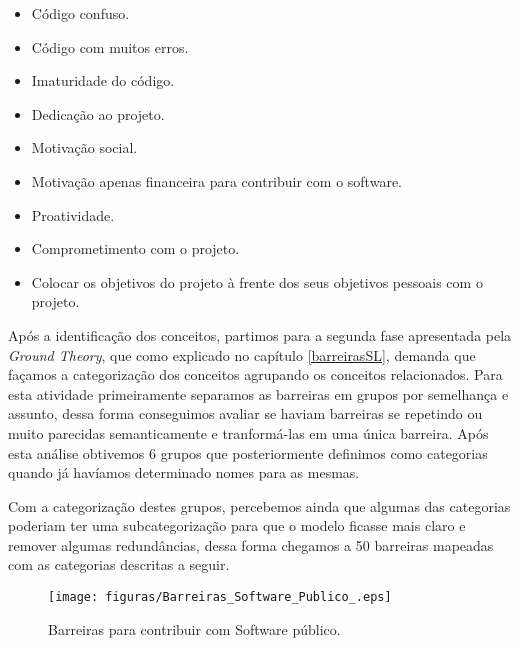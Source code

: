 \begin{itemize}
\item Código confuso.
\item Código com muitos erros.
\item Imaturidade do código.
%
\item Dedicação ao projeto.
\item Motivação social.
\item Motivação apenas financeira para contribuir com o software.
\item Proatividade.
\item Comprometimento com o projeto.
\item Colocar os objetivos do projeto à frente dos seus objetivos pessoais com o projeto.
%

\end{itemize}

Após a identificação dos conceitos, partimos para a segunda fase apresentada pela
\textit{Ground Theory}, que como explicado no capítulo \ref{barreirasSL}, demanda que  
façamos a categorização dos conceitos agrupando os conceitos relacionados. Para esta 
atividade primeiramente separamos as barreiras em grupos por semelhança e assunto,
dessa forma conseguimos avaliar se haviam barreiras se repetindo ou muito parecidas
semanticamente e tranformá-las em uma única barreira. Após esta análise obtivemos 6 
grupos que posteriormente definimos como categorias quando já havíamos determinado
nomes para as mesmas. 

Com a categorização destes grupos, percebemos ainda que algumas das categorias
poderiam ter uma subcategorização para que o modelo ficasse mais claro e remover
algumas redundâncias, dessa forma chegamos a 50 barreiras mapeadas com as categorias
descritas a seguir.


\begin{figure}[h]
	\centering
	\label{fig:SPbarreiras}
		\texttt{[image: figuras/Barreiras\_Software\_Publico\_.eps]}
	\caption{Barreiras para contribuir com Software público.}
\end{figure}


